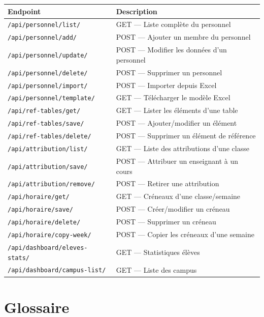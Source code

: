\documentclass[12pt,a4paper]{report}
\begin{document}
{\small
\begin{tabularx}{\textwidth}{lX}
\toprule
\textbf{Endpoint} & \textbf{Description} \\
\midrule
\texttt{/api/personnel/list/} & GET --- Liste compl\`ete du personnel \\
\texttt{/api/personnel/add/} & POST --- Ajouter un membre du personnel \\
\texttt{/api/personnel/update/} & POST --- Modifier les donn\'ees d'un personnel \\
\texttt{/api/personnel/delete/} & POST --- Supprimer un personnel \\
\texttt{/api/personnel/import/} & POST --- Importer depuis Excel \\
\texttt{/api/personnel/template/} & GET --- T\'el\'echarger le mod\`ele Excel \\
\texttt{/api/ref-tables/get/} & GET --- Lister les \'el\'ements d'une table \\
\texttt{/api/ref-tables/save/} & POST --- Ajouter/modifier un \'el\'ement \\
\texttt{/api/ref-tables/delete/} & POST --- Supprimer un \'el\'ement de r\'ef\'erence \\
\texttt{/api/attribution/list/} & GET --- Liste des attributions d'une classe \\
\texttt{/api/attribution/save/} & POST --- Attribuer un enseignant \`a un cours \\
\texttt{/api/attribution/remove/} & POST --- Retirer une attribution \\
\texttt{/api/horaire/get/} & GET --- Cr\'eneaux d'une classe/semaine \\
\texttt{/api/horaire/save/} & POST --- Cr\'eer/modifier un cr\'eneau \\
\texttt{/api/horaire/delete/} & POST --- Supprimer un cr\'eneau \\
\texttt{/api/horaire/copy-week/} & POST --- Copier les cr\'eneaux d'une semaine \\
\texttt{/api/dashboard/eleves-stats/} & GET --- Statistiques \'el\`eves \\
\texttt{/api/dashboard/campus-list/} & GET --- Liste des campus \\
\bottomrule
\end{tabularx}
}

\section{Glossaire}
\end{document}
